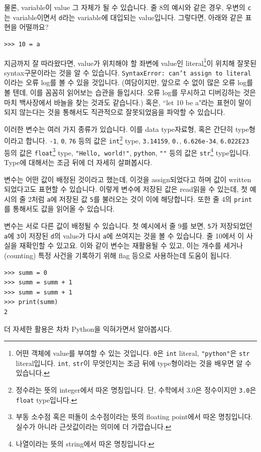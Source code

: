 \documentclass[../main.tex]{subfiles}
\begin{document}
물론, variable이 value 그 자체가 될 수 있습니다.
줄 8의 예시와 같은 경우, 우변의 \texttt{c}는 variable이면서 \texttt{d}라는 variable에 대입되는 value입니다.
그렇다면, 아래와 같은 표현을 어떨까요?
\begin{verbatim}
>>> 10 = a
\end{verbatim}
지금까지 잘 따라왔다면, value가 위치해야 할 좌변에 value인 literal\footnote{어떤 객체에 value를 부여할 수 있는 것입니다. \texttt{0}은 \texttt{int} literal, \texttt{"python"}은 \texttt{str} literal입니다. \texttt{int}, \texttt{str}이 무엇인지는 조금 뒤에 type형이라는 것을 배우면 알 수 있습니다.}이 위치해 잘못된 syntax구문이라는 것을 알 수 있습니다.
\texttt{SyntaxError: can't assign to literal}이라는 오류 log를 볼 수 있을 것입니다.
(여담이지만, 앞으로 수 없이 많은 오류 log를 볼 텐데, 이를 꼼꼼히 읽어보는 습관을 들입시다.
오류 log를 무시하고 디버깅하는 것은 마치 백사장에서 바늘을 찾는 것과도 같습니다.)
혹은, ``let 10 be a"라는 표현이 말이 되지 않는다는 것을 통해서도 직관적으로 잘못되었음을 파악할 수 있습니다.

이러한 변수는 여러 가지 종류가 있습니다.
이를 data type자료형, 혹은 간단히 type형이라고 합니다.
\texttt{-1}, \texttt{0}, \texttt{76} 등의 값은 \texttt{int}\footnote{정수라는 뜻의 integer에서 따온 명칭입니다. 단, 수학에서 3.0은 정수이지만 \texttt{3.0}은 \texttt{float} type입니다.} type, \texttt{3.14159}, \texttt{0.}, \texttt{6.626e-34}, \texttt{6.022E23} 등의 값은 \texttt{float}\footnote{부동 소수점 혹은 떠돌이 소수점이라는 뜻의 floating point에서 따온 명칭입니다. 실수가 아니라 근삿값이라는 의미에 더 가깝습니다.} type, \texttt{"Hello, world!"}, \texttt{\textquotesingle python\textquotesingle}, \texttt{""} 등의 값은 \texttt{str}\footnote{나열이라는 뜻의 string에서 따온 명칭입니다.} type입니다.
Type에 대해서는 조금 뒤에 더 자세히 살펴봅시다.

변수는 어떤 값이 배정된 것이라고 했는데, 이것을 assign되었다고 하며 값이 written되었다고도 표현할 수 있습니다.
이렇게 변수에 저장된 값은 read읽을 수 있는데, 첫 예시의 줄 2처럼 \texttt{a}에 저장된 값 \texttt{5}를 불러오는 것이 이에 해당합니다.
또한 줄 4의 \texttt{print}를 통해서도 값을 읽어올 수 있습니다.

변수는 서로 다른 값이 배정될 수 있습니다.
첫 예시에서 줄 9를 보면, \texttt{5}가 저장되었던 \texttt{a}에 \texttt{3}이 저장된 \texttt{d}의 value가 다시 \texttt{a}에 쓰여지는 것을 볼 수 있습니다.
줄 10에서 이 사실을 재확인할 수 있고요.
이와 같이 변수는 재활용될 수 있고, 이는 개수를 세거나(counting) 특정 사건을 기록하기 위해 flag 등으로 사용하는데 도움이 됩니다.
\begin{verbatim}
>>> summ = 0
>>> summ = summ + 1
>>> summ = summ + 1
>>> print(summ)
2
\end{verbatim}
더 자세한 활용은 차차 Python을 익혀가면서 알아봅시다.
\end{document}
